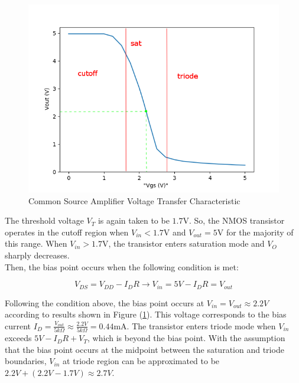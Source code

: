 \FloatBarrier

\begin{figure}[h!]
	\centering
	\includegraphics[scale=0.50]{./data/common_source_edited.png}
	\caption{Common Source Amplifier Voltage Transfer Characteristic}
	\label{fig:common_source}
\end{figure}

\FloatBarrier

The threshold voltage $V_T$ is again taken to be $1.7$\si{\volt}.
So, the NMOS transistor operates in the cutoff region when $V_{in} < 1.7$\si{\volt} and $V_{out} = 5$\si{\volt} for the majority of this range.
When $V_{in} > 1.7$\si{\volt}, the transistor enters saturation mode and $V_{O}$ sharply decreases. \\
Then, the bias point occurs when the following condition is met:

\begin{equation}
	\label{eq:bias_nmos_csa}
	V_{DS} = V_{DD} - I_{D}R \rightarrow V_{in} = 5V - I_{D}R = V_{out}
\end{equation}

Following the condition above, the bias point occurs at $V_{in} = V_{out} \approx 2.2V$ according to results shown in Figure (\ref{fig:common_source}).
This voltage corresponds to the bias current $I_{D} = \frac{V_{out}}{5k\Omega} \approx \frac{2.2V}{5k\Omega} = 0.44$\si{\milli\ampere}.
The transistor enters triode mode when $V_{in}$ exceeds $5V - I_{D}R + V_T$, which is beyond the bias point.
With the assumption that the bias point occurs at the midpoint between the saturation and triode boundaries, $V_{in}$ at triode region can be approximated to be $2.2V + (2.2V - 1.7V) \approx 2.7V$.

